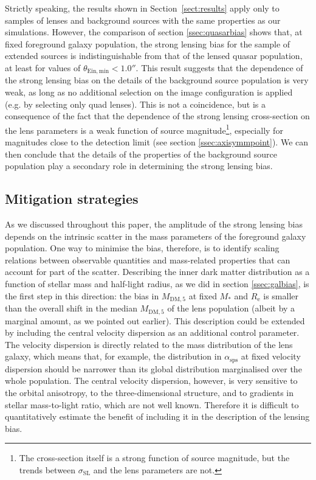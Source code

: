 \documentclass{aa}
\def\reff{R_{\mathrm{e}}}
\def\mstar{M_*}
\def\asps{\alpha_{\mathrm{sps}}}
\def\mdmfive{M_{\mathrm{DM}, 5}}
\def\crosssect{\sigma_\mathrm{{SL}}}
\def\Sref#1{Section~\ref{#1}\xspace}
\begin{document}
Strictly speaking, the results shown in \Sref{sect:results} apply only to samples of lenses and background sources with the same properties as our simulations.
However, the comparison of section \ref{ssec:quasarbias} shows that, at fixed foreground galaxy population, the strong lensing bias for the sample of extended sources is indistinguishable from that of the lensed quasar population, at least for values of $\theta_{\mathrm{Ein,min}} < 1.0''$.
This result suggests that the dependence of the strong lensing bias on the details of the background source population is very weak, as long as no additional selection on the image configuration is applied (e.g. by selecting only quad lenses).
This is not a coincidence, but is a consequence of the fact that the dependence of the strong lensing cross-section on the lens parameters is a weak function of source magnitude\footnote{The cross-section itself is a strong function of source magnitude, but the trends between $\crosssect$ and the lens parameters are not.}, especially for magnitudes close to the detection limit (see section \ref{ssec:axisymmpoint}).
We can then conclude that the details of the properties of the background source population play a secondary role in determining the strong lensing bias.

\subsection{Mitigation strategies}

As we discussed throughout this paper, the amplitude of the strong lensing bias depends on the intrinsic scatter in the mass parameters of the foreground galaxy population.
One way to minimise the bias, therefore, is to identify scaling relations between observable quantities and mass-related properties that can account for part of the scatter.
Describing the inner dark matter distribution as a function of stellar mass and half-light radius, as we did in section \ref{ssec:galbias}, is the first step in this direction: the bias in $\mdmfive$ at fixed $\mstar$ and $\reff$ is smaller than the overall shift in the median $\mdmfive$ of the lens population (albeit by a marginal amount, as we pointed out earlier).
This description could be extended by including the central velocity dispersion as an additional control parameter. 
The velocity dispersion is directly related to the mass distribution of the lens galaxy, which means that, for example, the distribution in $\asps$ at fixed velocity dispersion should be narrower than its global distribution marginalised over the whole population. 
The central velocity dispersion, however, is very sensitive to the orbital anisotropy, to the three-dimensional structure, and to gradients in stellar mass-to-light ratio, which are not well known. Therefore it is difficult to quantitatively estimate the benefit of including it in the description of the lensing bias.
\end{document}
